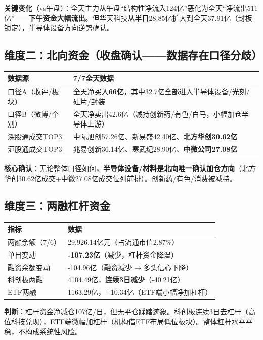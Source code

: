 \documentclass[a4paper,11pt,fontset=none]{ctexart}
\begin{document}
\textbf{关键变化}（vs午盘）：全天主力从午盘``结构性净流入124亿''恶化为全天``净流出511亿''——\textbf{下午资金大幅流出}。但华天科技从半日28.85亿扩大到全天37.91亿（封板锁定），半导体设备方向逆势确认。

\subsection*{维度二：北向资金（收盘确认——数据存在口径分歧）}

\begin{tabularx}{\textwidth}{L{3cm}X}
\toprule
\textbf{数据源} & \textbf{7/7全天数据} \\
\midrule
口径A（收评/板块） & 全天净买入\textbf{66亿}，其中32.7亿全部进入半导体设备/光刻/硅片/封装 \\
口径B（微博/个别） & 全天净卖出42.6亿（减持创新药/有色/白马，小幅加仓半导体上游） \\
深股通成交TOP3 & 中际旭创57.26亿、新易盛42.40亿、\textbf{北方华创30.62亿} \\
沪股通成交TOP3 & 兆易创新36.14亿、寒武纪28.90亿、\textbf{中微公司27.08亿} \\
\bottomrule
\end{tabularx}

\textbf{核心确认}：无论整体口径如何，\textbf{半导体设备/材料是北向唯一确认加仓方向}（北方华创30.62亿成交+中微27.08亿成交位列前排）。创新药/有色/消费被减持。

\subsection*{维度三：两融杠杆资金}

\begin{tabularx}{\textwidth}{L{3.5cm}X}
\toprule
\textbf{指标} & \textbf{数据} \\
\midrule
两融余额（7/6） & 29,926.14亿元（占流通市值2.87\%） \\
单日变动 & \textbf{-107.23亿}（减少，杠杆资金降温） \\
融资余额变动 & -104.96亿（融资减少$\to$多头信心下降） \\
科创板两融 & 4104.49亿，\textbf{连续3日减少}（-40.21亿） \\
ETF两融 & 1163.29亿，+10.34亿（ETF端小幅净加杠杆） \\
\bottomrule
\end{tabularx}

\textbf{判断}：杠杆资金净减仓107亿/日，但无平仓踩踏迹象。科创板连续3日去杠杆（高位科技兑现），ETF端微幅加杠杆（机构借ETF布局低位板块）。整体杠杆水平平稳，不构成系统性风险。
\end{document}
